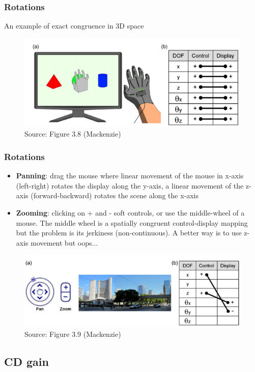 \documentclass{beamer}
\begin{document}
\begin{frame}
	\frametitle{Rotations}
	An example of exact congruence in 3D space
	\begin{figure}
		\includegraphics[width=0.7\linewidth]{image/3-8}
		\caption{Source: Figure 3.8 (Mackenzie)}
	\end{figure}
\end{frame}

\begin{frame}
	\frametitle{Rotations}
	\begin{itemize}
		\item \textbf{Panning}: drag the mouse where linear movement of the mouse in x-axis (left-right) rotates the display along the y-axis, a linear movement of the z-axis (forward-backward) rotates the scene along the x-axis
		\item \textbf{Zooming}: clicking on + and - soft controls, or use the middle-wheel of a mouse. The middle wheel is a spatially congruent control-display mapping but the problem is its jerkiness (non-continuous).  A better way is to use z-axis movement but oops...%
	\end{itemize}
	\begin{figure}
		\includegraphics[width=0.5\linewidth]{image/3-9}
		\caption{Source: Figure 3.9 (Mackenzie)}
	\end{figure}
\end{frame}

\subsection{CD gain}
\end{document}
